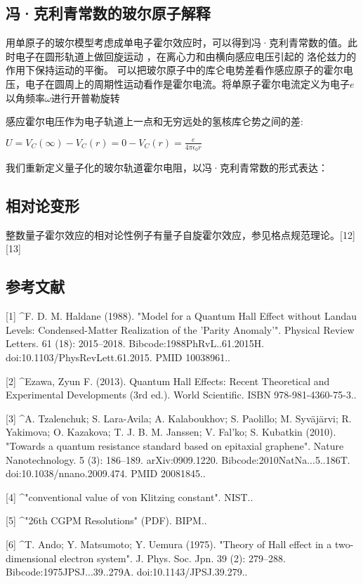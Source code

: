 \subsection{冯·克利青常数的玻尔原子解释}
用单原子的玻尔模型考虑成单电子霍尔效应时，可以得到冯·克利青常数的值。此时电子在圆形轨道上做回旋运动 ，在离心力和由横向感应电压引起的 洛伦兹力的作用下保持运动的平衡。 可以把玻尔原子中的库仑电势差看作感应原子的霍尔电压，电子在圆周上的周期性运动看作是霍尔电流。将单原子霍尔电流定义为电子$e$以角频率$\omega$进行开普勒旋转

感应霍尔电压作为电子轨道上一点和无穷远处的氢核库仑势之间的差:

$U = V_C(\infty) - V_C(r) = 0 - V_C(r) = \frac{e}{4 \pi \epsilon_0 r}$

我们重新定义量子化的玻尔轨道霍尔电阻，以冯·克利青常数的形式表达：

\subsection{相对论变形}
整数量子霍尔效应的相对论性例子有量子自旋霍尔效应，参见格点规范理论。[12][13]

\subsection{参考文献}
[1]
^F. D. M. Haldane (1988). "Model for a Quantum Hall Effect without Landau Levels: Condensed-Matter Realization of the 'Parity Anomaly'". Physical Review Letters. 61 (18): 2015–2018. Bibcode:1988PhRvL..61.2015H. doi:10.1103/PhysRevLett.61.2015. PMID 10038961..

[2]
^Ezawa, Zyun F. (2013). Quantum Hall Effects: Recent Theoretical and Experimental Developments (3rd ed.). World Scientific. ISBN 978-981-4360-75-3..

[3]
^A. Tzalenchuk; S. Lara-Avila; A. Kalaboukhov; S. Paolillo; M. Syväjärvi; R. Yakimova; O. Kazakova; T. J. B. M. Janssen; V. Fal'ko; S. Kubatkin (2010). "Towards a quantum resistance standard based on epitaxial graphene". Nature Nanotechnology. 5 (3): 186–189. arXiv:0909.1220. Bibcode:2010NatNa...5..186T. doi:10.1038/nnano.2009.474. PMID 20081845..

[4]
^"conventional value of von Klitzing constant". NIST..

[5]
^"26th CGPM Resolutions" (PDF). BIPM..

[6]
^T. Ando; Y. Matsumoto; Y. Uemura (1975). "Theory of Hall effect in a two-dimensional electron system". J. Phys. Soc. Jpn. 39 (2): 279–288. Bibcode:1975JPSJ...39..279A. doi:10.1143/JPSJ.39.279..

